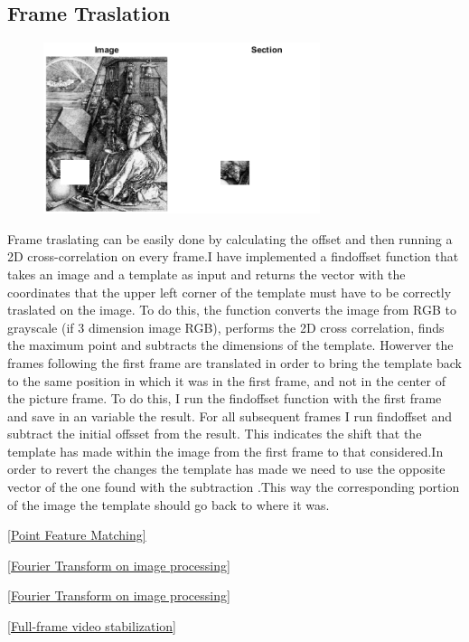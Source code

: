 \documentclass[a4paper]{article}
\newcommand{\ao}[1]{{\color{ao}[#1]}}
\begin{document}
	\subsection{Frame Traslation}
	\begin{figure}[htpb!] 
		\centering 
		\includegraphics[height=50mm]{ImageTraslation.png}
	\end{figure}
	Frame traslating can be easily done by calculating the offset and then running a 2D cross-correlation on every frame.I have implemented a findoffset function that takes an image and a template as input and returns the vector with the coordinates that the upper left corner of the template must have to be correctly traslated on the image.
	To do this, the function converts the image from RGB to grayscale (if 3 dimension image RGB), performs the 2D cross correlation, finds the maximum point and subtracts the dimensions of the template.
	Howerver the frames following the first frame are translated in order to bring the template back to the same position in which it was in the first frame, and not in the center of the picture frame. To do this, I run the findoffset function with the first frame and save in an variable the
	result. For all subsequent frames I run findoffset and subtract the initial offsset from the result. This indicates the shift that the template has made within the image from the first frame to that considered.In order to revert the changes the template has made we need to use the opposite vector of the one found with the subtraction .This way the corresponding portion of the image the template should go back to where it was.

	\newpage
	
	\begin{thebibliography}{10}
		\item \href{https://it.mathworks.com/help/vision/ug/video-stabilization-using-point-feature-matching.html#videostabilize_pm-6/}{\ao{Point Feature Matching}}
		\item 
		\href{https://homepages.inf.ed.ac.uk/rbf/HIPR2/fourier.htm}{\ao{Fourier Transform on image processing}}
		\item 
		\href{https://it.mathworks.com/help/images/fourier-transform.html}{\ao{Fourier Transform on image processing}}
		\item 
		\href{https://www.researchgate.net/publication/4156296_Full-frame_video_stabilization}{\ao{Full-frame video stabilization}}
		
	\end{thebibliography}
	
\end{document}
